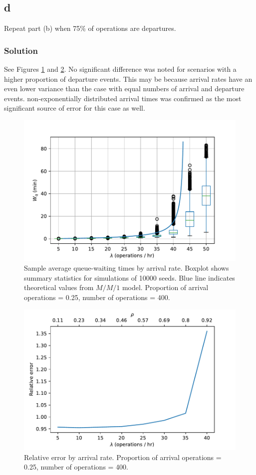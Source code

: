 \documentclass[letterpaper]{amsart}
\begin{document}
\subsection*{d}
Repeat part (b) when 75\% of operations are departures.
\subsubsection*{Solution}
See Figures \ref{fig:5d} and \ref{fig:5db}.
No significant difference was noted for scenarios with a higher proportion of
departure events. This may be because arrival rates have an even lower variance
than the case with equal numbers of arrival and departure events.
non-exponentially distributed arrival times was confirmed as the most
significant source of error for this case as well.
\begin{figure}[h!]
  \centering
  \caption{Sample average queue-waiting times by arrival rate. Boxplot shows
    summary statistics for simulations of 10000 seeds. Blue line indicates
    theoretical values from $M/M/1$ model.
    Proportion of arrival operations = 0.25, number of operations = 400.}
  \label{fig:5d}
  \includegraphics[width=\textwidth]{W_q2}
\end{figure}
\begin{figure}
  \centering
  \caption{Relative error by arrival rate.
    Proportion of arrival operations = 0.25, number of operations = 400.}
  \label{fig:5db}
  \includegraphics[width=\textwidth]{er2}
\end{figure}
\end{document}
